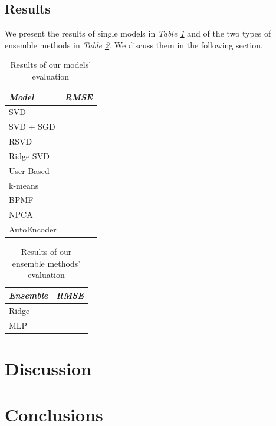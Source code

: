 \documentclass[10pt,conference,compsocconf]{IEEEtran}
\begin{document}
\subsection{Results}

We present the results of single models in \emph{Table \ref{tabres}} and of the two types of ensemble methods in \emph{Table \ref{ensres}}. We discuss them in the following section.

\begin{table}[h!]
	\centering
	\begin{tabular}{l|l}
		\textit{\textbf{Model}} & \textit{\textbf{RMSE}} \\
		\hline
		SVD                     &                        \\
		SVD + SGD               &                        \\
		RSVD       	            &                        \\
		Ridge SVD               &                        \\
		User-Based              &                        \\
		k-means                 &                        \\
		BPMF                    &                        \\
		NPCA                    &                        \\
		AutoEncoder             &                       
	\end{tabular}
\caption{Results of our models' evaluation}
\label{tabres}
\end{table}

\begin{table}[h!]
	\centering
	\begin{tabular}{l|l}
		\textit{\textbf{Ensemble}} & \textit{\textbf{RMSE}} \\
		\hline
		Ridge                     &                        \\
		MLP      	            &                                            
	\end{tabular}
\caption{Results of our ensemble methods' evaluation}
\label{ensres}
\end{table}

\section{Discussion}
\label{disc}


\section{Conclusions}
\label{conc}



%
\end{document}
